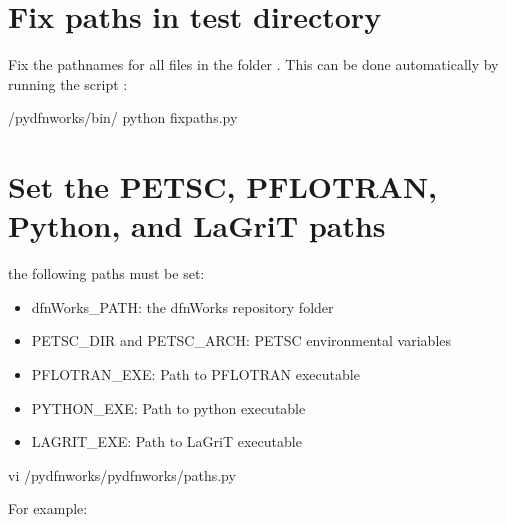 \documentclass[letterpaper,10pt,english]{sphinxmanual}
\begin{document}
\section{Fix paths in test directory}
\label{\detokenize{setup:fix-paths-in-test-directory}}
Fix the pathnames for all files in the folder  . This can be done automatically by running the script :

%
\begin{sphinxVerbatim}[commandchars=\\\{\}]
\PYGZdl{}  /pydfnworks/bin/
\PYGZdl{} python fix\PYGZus{}paths.py
\end{sphinxVerbatim}


\section{Set the PETSC, PFLOTRAN, Python, and LaGriT paths}
\label{\detokenize{setup:set-the-petsc-pflotran-python-and-lagrit-paths}}
 the following paths must be set:
\begin{itemize}
\item {} 
dfnWorks\_PATH: the dfnWorks repository folder

\item {} 
PETSC\_DIR and PETSC\_ARCH: PETSC environmental variables

\item {} 
PFLOTRAN\_EXE:  Path to PFLOTRAN executable

\item {} 
PYTHON\_EXE:  Path to python executable

\item {} 
LAGRIT\_EXE:  Path to LaGriT executable

\end{itemize}

%
\begin{sphinxVerbatim}[commandchars=\\\{\}]
\PYGZdl{} vi /pydfnworks/pydfnworks/paths.py
\end{sphinxVerbatim}

For example:

%
\begin{sphinxVerbatim}[commandchars=\\\{\}]
\PYG{p}{[}\PYG{p}{]}  
\end{sphinxVerbatim}
\end{document}
